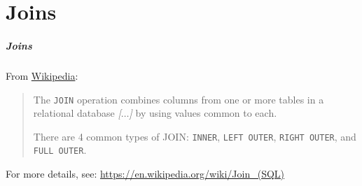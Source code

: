 \documentclass[english,serif,mathserif]{beamer}
\begin{document}
\part{Joins}
\begin{frame}
  \frametitle{Joins}

  From \href{https://en.wikipedia.org/wiki/Join_(SQL)}{Wikipedia}:

  \+
  \begin{quote}
    The \texttt{JOIN} operation combines columns from one or more tables in a
    relational database {\em [$\ldots$]} by using values common to each.

    \+ There are 4 common types of JOIN: \texttt{INNER},
    \texttt{LEFT~OUTER}, \texttt{RIGHT~OUTER}, and \texttt{FULL~OUTER}.
  \end{quote}

   \+
   \begin{references}
     For more details, see:
     \url{https://en.wikipedia.org/wiki/Join_(SQL)}
   \end{references}
\end{frame}
\end{document}
